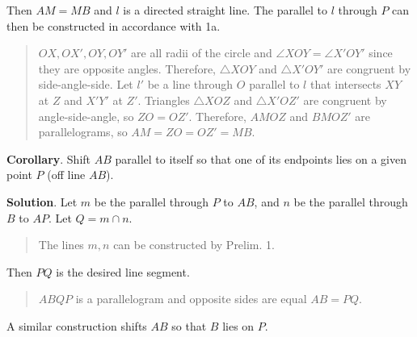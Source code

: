 Then $AM = MB$ and $l$ is a directed straight line. The parallel to $l$ through $P$ can then be constructed in accordance with 1a. 
\begin{quote}
\vspace*{-6pt}
$OX,OX',OY,OY'$ are all radii of the circle and $\angle XOY = \angle X'OY'$ since they are opposite angles. Therefore, $\triangle XOY$ and $\triangle X'OY'$ are congruent by side-angle-side. Let $l'$ be a line through $O$ parallel to $l$ that intersects $XY$ at $Z$ and $X'Y'$ at $Z'$. Triangles $\triangle XOZ$ and $\triangle X'OZ'$ are congruent by angle-side-angle, so $ZO=OZ'$. Therefore, $AMOZ$ and $BMOZ'$ are parallelograms, so $AM=ZO=OZ'=MB$.
\vspace*{-6pt}
\end{quote}

\textbf{Corollary}. Shift $AB$ parallel to itself so that one of its endpoints lies on a given point $P$ (off line $AB$).

\textbf{Solution}. Let $m$ be the parallel through $P$ to $AB$, and $n$ be the parallel through $B$ to $AP$. Let $Q = m \cap n$. 
\begin{quote}
\vspace*{-6pt}
The lines $m,n$ can be constructed by Prelim. 1.
\vspace*{-6pt}
\end{quote}
\begin{center}
\end{center}
Then $PQ$ is the desired line segment.
\begin{quote}
\vspace*{-8pt}
$ABQP$ is a parallelogram and opposite sides are equal $AB=PQ$.
\vspace*{-8pt}
\end{quote}
A similar construction shifts $AB$ so that $B$ lies on $P$.  

